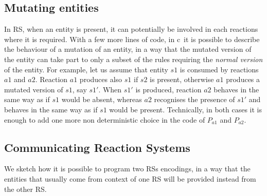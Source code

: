 \subsection{Mutating entities} 
In RS, when an entity is present, it can potentially be involved in each reactions where it is required.
With a few more lines of code, in c\CNA~it is possible to describe the behaviour of a mutation of 
an entity, in a way that the mutated version of the entity can take 
part to only a subset of the rules requiring  the  \emph{normal version} of the entity.
For example, let us assume that entity $s1$ is consumed by reactions $a1$ and $a2$.
Reaction $a1$ produces also $s1$ if $s2$ is present, otherwise $a1$ produces a mutated version of $s1$, 
say $s1'$.
When $s1'$ is produced, reaction $a2$ behaves in the same way as if $s1$ would be absent, whereas $a2$
recognises the presence of $s1'$ and behaves in the same way as if $s1$ would be present.
Technically, in both cases it is enough to add one more non 
deterministic choice in the code of $P_{a1}$ and $P_{a2}$. 


\subsection{Communicating Reaction Systems}
We sketch how it is possible to program two RSs encodings, in a way that
the entities that usually come from context of one RS will be provided instead from the other RS.


